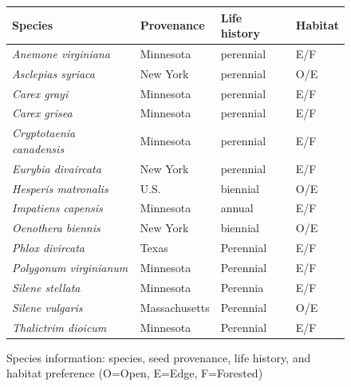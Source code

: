 \documentclass[12pt]{article}\usepackage[]{graphicx}\usepackage[]{color}
\begin{document}
\begin{figure}[here]
\begin{center}
\begin{tabular}{|l|l|l|l|}
\hline
\textbf{Species} & \textbf{Provenance} & \textbf{Life history} & \textbf{Habitat}\\
\hline
\textit{Anemone virginiana} & Minnesota & perennial & E/F\\
\hline
\textit{Asclepias syriaca} & New York & perennial & O/E \\
\hline
\textit{Carex grayi} & Minnesota & perennial & E/F\\
\hline
\textit{Carex grisea}& Minnesota & perennial & E/F\\
\hline
\textit{Cryptotaenia canadensis} & Minnesota & perennial & E/F\\
\hline
\textit{Eurybia divaircata} & New York & perennial & E/F\\
\hline
\textit{Hesperis matronalis} & U.S. & biennial & O/E\\
\hline
\textit{Impatiens capensis} & Minnesota & annual & E/F \\
\hline
\textit{Oenothera biennis} & New York & biennial & O/E \\
\hline
\textit{Phlox divircata} & Texas & Perennial & E/F\\
\hline
\textit{Polygonum virginianum} & Minnesota & Perennial & E/F\\
\hline
\textit{Silene stellata} & Minnesota & Perennia & E/F\\
\hline
\textit{Silene vulgaris} & Massachusetts & Perennial & O/E\\
\hline
\textit{Thalictrim dioicum} & Minnesota & Perennial & E/F\\
\hline
\end{tabular}
\caption{Species information: species, seed provenance, life history, and habitat preference (O=Open, E=Edge, F=Forested)}
\label{fig:Figure 5}
\end{center}
\end{figure}
\end{document}
